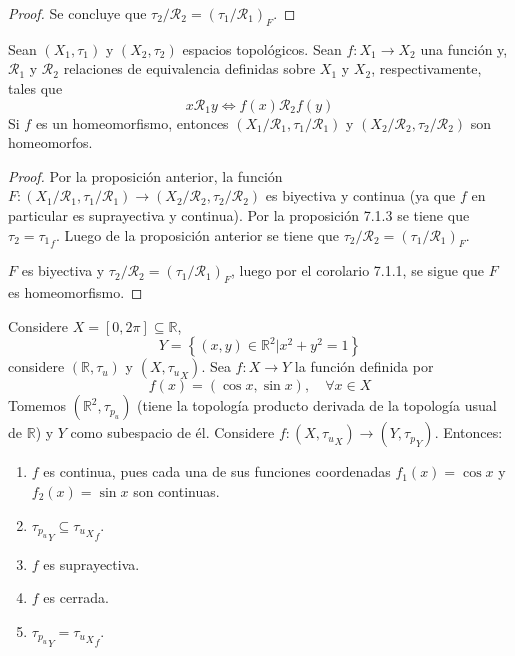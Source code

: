 \documentclass[12pt]{report}
\theoremstyle{largebreak}
\newcommand\cf[3]{\ensuremath{#1:#2\rightarrow#3}}
\begin{document}
\begin{proof}
        Se concluye que $\tau_2/\mathcal{R}_2=\left(\tau_1/\mathcal{R}_1\right)_F$.
    \end{proof}

    \begin{cor}
        Sean $(X_1,\tau_1)$ y $(X_2,\tau_2)$ espacios topológicos. Sean $\cf{f}{X_1}{X_2}$ una función y, $\mathcal{R}_1$ y $\mathcal{R}_2$ relaciones de equivalencia definidas sobre $X_1$ y $X_2$, respectivamente, tales que
        \begin{equation*}
            x\mathcal{R}_1y\iff f(x)\mathcal{R}_2f(y)
        \end{equation*}
        Si $f$ es un homeomorfismo, entonces $(X_1/\mathcal{R}_1,\tau_1/\mathcal{R}_1)$ y $(X_2/\mathcal{R}_2,\tau_2/\mathcal{R}_2)$ son homeomorfos.
    \end{cor}

    \begin{proof}
        Por la proposición anterior, la función $\cf{F}{(X_1/\mathcal{R}_1,\tau_1/\mathcal{R}_1)}{(X_2/\mathcal{R}_2,\tau_2/\mathcal{R}_2)}$ es biyectiva y continua (ya que $f$ en particular es suprayectiva y continua). Por la proposición 7.1.3 se tiene que $\tau_2={\tau_1}_f$. Luego de la proposición anterior se tiene que $\tau_2/\mathcal{R}_2=\left(\tau_1/\mathcal{R}_1\right)_F$.

        $F$ es biyectiva y $\tau_2/\mathcal{R}_2=\left(\tau_1/\mathcal{R}_1\right)_F$, luego por el corolario 7.1.1, se sigue que $F$ es homeomorfismo.
    \end{proof}

    \begin{exa}
        Considere $X=[0,2\pi]\subseteq\mathbb{R}$,
        \begin{equation*}
            Y=\left\{(x,y)\in\mathbb{R}^2\Big|x^2+y^2=1 \right\}
        \end{equation*}
        considere $(\mathbb{R},\tau_u)$ y $(X,{\tau_u}_{X})$. Sea $\cf{f}{X}{Y}$ la función definida por
        \begin{equation*}
            f(x)=(\cos x,\sin x),\quad\forall x\in X
        \end{equation*}
        Tomemos $(\mathbb{R}^2,\tau_{p_u})$ (tiene la topología producto derivada de la topología usual de $\mathbb{R}$) y $Y$ como subespacio de él. Considere $\cf{f}{(X,{\tau_{u}}_X)}{(Y,{\tau_p}_Y)}$. Entonces:
        \begin{enumerate}
            \item $f$ es continua, pues cada una de sus funciones coordenadas $f_1(x)=\cos x$ y $f_2(x)=\sin x$ son continuas.
            \item ${\tau_{ p_u}}_Y\subseteq{{\tau_u}_X}_f$.
            \item $f$ es suprayectiva.
            \item $f$ es cerrada.
            \item ${\tau_{ p_u}}_Y={{\tau_u}_X}_f$.
        \end{enumerate}
    \end{exa}
\end{document}
